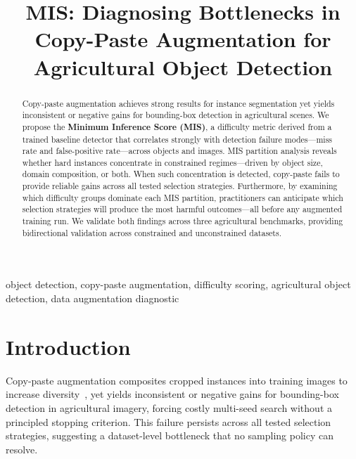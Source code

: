 \documentclass[conference,a4paper]{IEEEtran}
\begin{document}
\title{MIS: Diagnosing Bottlenecks in Copy-Paste Augmentation
for Agricultural Object Detection}

\author{
}

\maketitle

\begin{abstract}
Copy-paste augmentation achieves strong results for instance
segmentation yet yields inconsistent or negative gains for
bounding-box detection in agricultural scenes.
We propose the \textbf{Minimum Inference Score (MIS)}, a
difficulty metric derived from a trained baseline detector
that correlates strongly with detection failure modes---miss
rate and false-positive rate---across objects and images.
MIS partition analysis reveals whether hard instances
concentrate in constrained regimes---driven by object
size, domain composition, or both.
When such concentration is detected, copy-paste fails
to provide reliable gains across all tested selection
strategies.
Furthermore, by examining which difficulty groups dominate
each MIS partition, practitioners can anticipate which
selection strategies will produce the most harmful
outcomes---all before any augmented training run.
We validate both findings across three agricultural
benchmarks, providing bidirectional validation across
constrained and unconstrained datasets.
\end{abstract}

\begin{IEEEkeywords}
object detection, copy-paste augmentation, difficulty scoring,
agricultural object detection, data augmentation diagnostic
\end{IEEEkeywords}

\section{Introduction}
Copy-paste augmentation composites cropped instances into
training images to increase diversity~\cite{kisantal2019augmentation,
ghiasi2021simple}, yet yields inconsistent or negative gains
for bounding-box detection in agricultural imagery, forcing
costly multi-seed search without a principled stopping criterion.
This failure persists across all tested selection strategies,
suggesting a dataset-level bottleneck that no sampling policy
can resolve.
\end{document}
